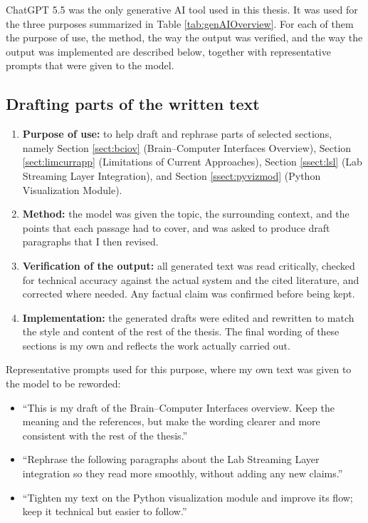 \documentclass[12pt,a4paper,openany]{book}
\theoremstyle{definition}
\theoremstyle{remark}
\begin{document}
ChatGPT 5.5 was the only generative AI tool used in this thesis. It was used for the three purposes summarized in Table \ref{tab:genAIOverview}. For each of them the purpose of use, the method, the way the output was verified, and the way the output was implemented are described below, together with representative prompts that were given to the model.

\subsection*{Drafting parts of the written text}
\begin{enumerate}
    \item \textbf{Purpose of use:} to help draft and rephrase parts of selected sections, namely Section \ref{sect:bciov} (Brain--Computer Interfaces Overview), Section \ref{sect:limcurrapp} (Limitations of Current Approaches), Section \ref{ssect:lsl} (Lab Streaming Layer Integration), and Section \ref{ssect:pyvizmod} (Python Visualization Module).
    \item \textbf{Method:} the model was given the topic, the surrounding context, and the points that each passage had to cover, and was asked to produce draft paragraphs that I then revised.
    \item \textbf{Verification of the output:} all generated text was read critically, checked for technical accuracy against the actual system and the cited literature, and corrected where needed. Any factual claim was confirmed before being kept.
    \item \textbf{Implementation:} the generated drafts were edited and rewritten to match the style and content of the rest of the thesis. The final wording of these sections is my own and reflects the work actually carried out.
\end{enumerate}

\noindent Representative prompts used for this purpose, where my own text was given to the model to be reworded:
\begin{itemize}
    \item ``This is my draft of the Brain--Computer Interfaces overview. Keep the meaning and the references, but make the wording clearer and more consistent with the rest of the thesis.''
    \item ``Rephrase the following paragraphs about the Lab Streaming Layer integration so they read more smoothly, without adding any new claims.''
    \item ``Tighten my text on the Python visualization module and improve its flow; keep it technical but easier to follow.''
\end{itemize}
\end{document}
